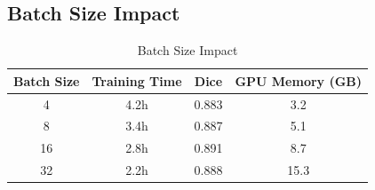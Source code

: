 \documentclass[runningheads]{llncs}
\begin{document}
\subsection{Batch Size Impact}
\begin{table}[H]
\caption{Batch Size Impact}
\centering
\begin{tabular}{cccc}
\toprule
\textbf{Batch Size} & \textbf{Training Time} & \textbf{Dice} & \textbf{GPU Memory (GB)} \\
\midrule
4 & 4.2h & 0.883 & 3.2 \\
8 & 3.4h & 0.887 & 5.1 \\
16 & 2.8h & 0.891 & 8.7 \\
32 & 2.2h & 0.888 & 15.3 \\
\bottomrule
\end{tabular}
\end{table}
\end{document}
